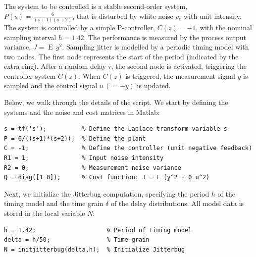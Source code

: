 \documentclass[final,twoside]{rapport}  %
\DeclareMathOperator{\E}{E\,}
\begin{document}
The system to be controlled is a stable second-order system, $P(s) =
\frac{6}{(s+1)(s+2)}$, that is disturbed by white noise $v_c$ with
unit intensity. The system is controlled by a simple P-controller,
$C(z) = -1$, with the nominal sampling interval $h=1.42$. The
performance is measured by the process output variance, $J= \E y^2$.
Sampling jitter is modelled by a periodic timing model with two
nodes. The first node represents the start of the period (indicated by
the extra ring). After a random delay $\tau$, the second node is
activated, triggering the controller system $C(z)$. When $C(z)$ is
triggered, the measurement signal $y$ is sampled and the control
signal $u\, (=-y)$ is updated.

Below, we walk through the details of the script. We start by defining the systems and the noise and cost matrices in
Matlab:
\begin{small}
\begin{verbatim}
s = tf('s');          % Define the Laplace transform variable s
P = 6/((s+1)*(s+2));  % Define the plant
C = -1;               % Define the controller (unit negative feedback)
R1 = 1;               % Input noise intensity
R2 = 0;               % Measurement noise variance
Q = diag([1 0]);      % Cost function: J = E (y^2 + 0 u^2)
\end{verbatim}
\end{small}

Next, we initialize the Jitterbug computation, specifying the period $h$
of the timing model and the time grain $\delta$ of the delay distributions. All
model data is stored in the local variable $N$:

\begin{small}
\begin{verbatim}
h = 1.42;                    % Period of timing model
delta = h/50;                % Time-grain
N = initjitterbug(delta,h);  % Initialize Jitterbug
\end{verbatim}
\end{small}
\end{document}
